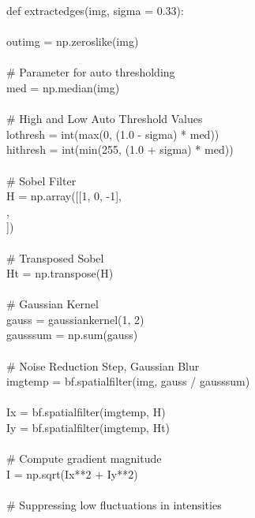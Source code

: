 \documentclass{article}
\begin{document}
	\noindent def extract\textunderscore edges(img, sigma = 0.33):\\
	\\
	\indent out\textunderscore img = np.zeros\textunderscore like(img)\\
	\\
	\indent \# Parameter for auto thresholding\\
	\indent med = np.median(img)\\
	\\
	\indent \# High and Low Auto Threshold Values\\
	\indent lo\textunderscore thresh = int(max(0, (1.0 - sigma) * med))\\
	\indent hi\textunderscore thresh = int(min(255, (1.0 + sigma) * med))\\
	\\
	\indent \# Sobel Filter\\
	\indent H = np.array([[1, 0, -1],\\
	\indent \indent [2, 0, -2],\\
	\indent \indent [1, 0, -1]])\\
	\\
	\indent \# Transposed Sobel\\
	\indent H\textunderscore t = np.transpose(H)\\
	\\
	\indent \# Gaussian Kernel\\
	\indent gauss = gaussian\textunderscore kernel(1, 2)\\
	\indent gauss\textunderscore sum = np.sum(gauss)\\
	\\
	\indent \# Noise Reduction Step, Gaussian Blur\\
	\indent img\textunderscore temp = bf.spatial\textunderscore filter(img, gauss / gauss\textunderscore sum)\\
	\\
	\indent I\textunderscore x = bf.spatial\textunderscore filter(img\textunderscore temp, H)\\
	\indent I\textunderscore y = bf.spatial\textunderscore filter(img\textunderscore temp, H\textunderscore t)\\
	\\
	\indent \# Compute gradient magnitude\\
	\indent I = np.sqrt(I\textunderscore x**2 + I\textunderscore y**2)\\
	\\
	\indent \# Suppressing low fluctuations in intensities\\
\end{document}
